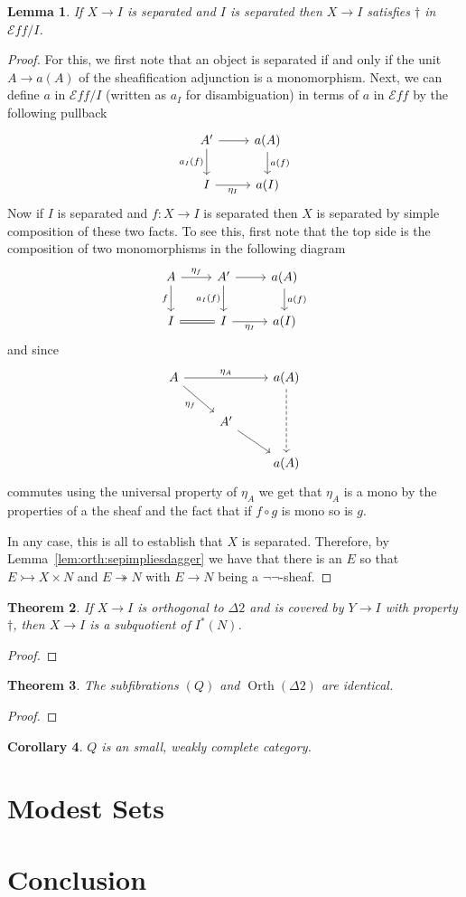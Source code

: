 \documentclass[12pt]{amsart}
\newcommand{\todo}[1]{{\color{red}{\LARGE #1}}}
\newcommand{\eff}{\mathcal{E}\!f\!f}
\newcommand{\epi}{\ensuremath{\twoheadrightarrow}}
\newcommand{\mono}{\ensuremath{\rightarrowtail}}
\DeclareMathOperator{\orth}{Orth}
\newtheorem{thm}{Theorem}[section]
\newtheorem{cor}[thm]{Corollary}
\newtheorem{lem}[thm]{Lemma}
\begin{document}
\begin{lem}\label{defn:orth:sepsliceimpliesdagger}
  If $X \to I$ is separated and $I$ is separated then $X \to I$
  satisfies $\dagger$ in $\eff/I$.
\end{lem}
\begin{proof}
  For this, we first note that an object is separated if and only if
  the unit $A \to a(A)$ of the sheafification adjunction is a
  monomorphism. Next, we can define $a$ in $\eff/I$ (written as $a_I$
  for disambiguation) in terms of $a$ in $\eff$ by the following
  pullback
  \[
    \begin{tikzcd}
      A' \ar[r] \ar[d, swap, "a_I(f)"] & a(A) \ar[d, "a(f)"]\\
      I \ar[r, swap, "\eta_I"] & a(I)
    \end{tikzcd}
  \]
  Now if $I$ is separated and $f : X \to I$ is separated then $X$ is
  separated by simple composition of these two facts. To see this,
  first note that the top side is the composition of two monomorphisms
  in the following diagram
  \[
    \begin{tikzcd}
      A \ar[d, swap, "f"] \ar[r, "\eta_f"] & A' \ar[r] \ar[d, swap, "a_I(f)"] & a(A) \ar[d, "a(f)"]\\
      I \ar[r, equals] & I \ar[r, swap, "\eta_I"] & a(I)
    \end{tikzcd}
  \]
  and since
  \[
    \begin{tikzcd}
      A \ar[rd, swap, "\eta_f"] \ar[rr, "\eta_A"]&& a(A) \ar[dd, dashed]\\
      &A' \ar[dr]&\\
      && a(A)
    \end{tikzcd}
  \]
  commutes using the universal property of $\eta_A$ we get that
  $\eta_A$ is a mono by the properties of a the sheaf and the fact
  that if $f \circ g$ is mono so is $g$.

  In any case, this is all to establish that $X$ is
  separated. Therefore, by Lemma~\ref{lem:orth:sepimpliesdagger} we
  have that there is an $E$ so that $E \mono X \times N$ and $E \epi
  N$ with $E \to N$ being a $\neg\neg$-sheaf.
\end{proof}
\begin{thm}\label{thm:orth:seporth}
  If $X \to I$ is orthogonal to $\Delta 2$ and is covered by $Y \to I$
  with property $\dagger$, then $X \to I$ is a subquotient of
  $I^*(N)$.
\end{thm}
\begin{proof}
  \todo{Should prove}
\end{proof}
\begin{thm}\label{defn:orth:seporth}
  The subfibrations $(Q)$ and $\orth(\Delta 2)$ are identical.
\end{thm}
\begin{proof}
  \todo{Really should prove}
\end{proof}
\begin{cor}
  $Q$ is an small, weakly complete category.
\end{cor}

\section{Modest Sets}\label{sec:modest}
\section{Conclusion}\label{sec:conclusion}


{}
\end{document}
